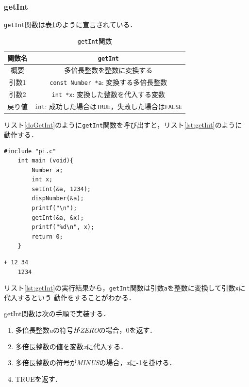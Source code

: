 \documentclass[a4paper,11pt,dvipdfmx]{jsarticle}
\begin{document}
\subsubsection{getInt}
\texttt{getInt}関数は表\ref{table:lst:getInt}のように宣言されている．

\begin{table}[H]
\centering
\caption{\texttt{getInt}関数}
\label{table:lst:getInt}
\begin{tabular}{c||c}
\hline
関数名    & \texttt{getInt}   \\
\hline
概要    & 多倍長整数を整数に変換する   \\
\hline
引数1   & \texttt{const Number *a}: 変換する多倍長整数  \\
引数2   & \texttt{int *x}: 変換した整数を代入する変数  \\
\hline
戻り値    & \texttt{int}: 成功した場合は\texttt{TRUE}，失敗した場合は\texttt{FALSE}   \\
\hline
\end{tabular}
\end{table}

リスト\ref{doGetInt}のように\texttt{getInt}関数を呼び出すと，リスト\ref{lst:getInt}のように動作する．
\begin{lstlisting}[caption=\texttt{getInt}関数の呼び出し,label=doGetInt]
    #include "pi.c"
    int main (void){
        Number a;
        int x;
        setInt(&a, 1234);
        dispNumber(&a);
        printf("\n");
        getInt(&a, &x);
        printf("%d\n", x);
        return 0;
    }
\end{lstlisting}

\begin{lstlisting}[caption=リスト\ref{doGetInt}の実行結果,label=lst:getInt]
    + 12 34
    1234
\end{lstlisting}

リスト\ref{lst:getInt}の実行結果から，\texttt{getInt}関数は引数\texttt{a}を整数に変換して引数\texttt{x}に代入するという
動作をすることがわかる．

getInt関数は次の手順で実装する．
\begin{enumerate}
    \item 多倍長整数\textit{a}の符号が\textit{ZERO}の場合，0を返す．
    \item 多倍長整数の値を変数\textit{x}に代入する．
    \item 多倍長整数の符号が\textit{MINUS}の場合，\textit{x}に-1を掛ける．
    \item TRUEを返す．
\end{enumerate}
\end{document}
